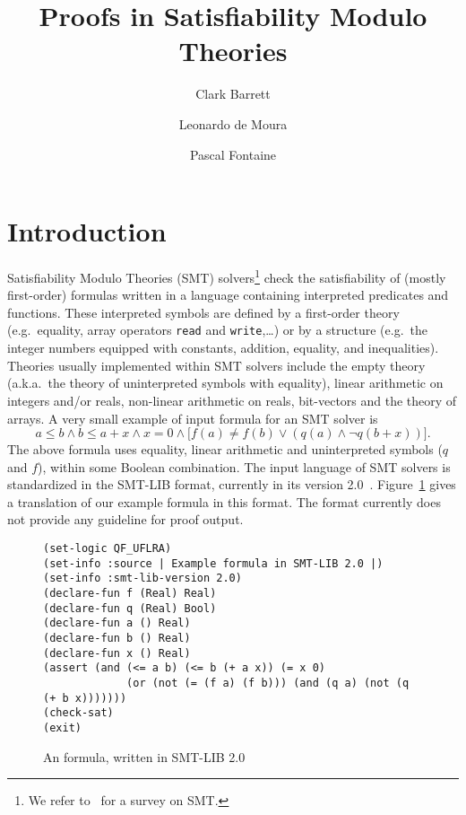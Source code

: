 \documentclass{llncs}
\title{ Proofs in Satisfiability Modulo Theories }
\author{
  Clark Barrett \inst{1}
  \and 
  Leonardo de Moura \inst{2}
  \and
  Pascal Fontaine \inst{3}
}
\institute{
  New York University\\
  \email{barrett@cs.nyu.edu}
  \and 
  Microsoft Research \\
  \email{leonardo@microsoft.com}
  \and
  University of Lorraine and INRIA\\
  \email{pascal.fontaine@inria.fr}
}
\begin{document}
\maketitle

\section{Introduction}

Satisfiability Modulo Theories (SMT) solvers\footnote{We refer
  to~\cite{Barrett14} for a survey on SMT.} check the satisfiability of (mostly
first-order) formulas written in a language containing interpreted predicates
and functions.  These interpreted symbols are defined by a first-order theory
(e.g.\ equality, array operators {\tt read} and {\tt write},\dots) or by a
structure (e.g.\ the integer numbers equipped with constants, addition,
equality, and inequalities).  Theories usually implemented within SMT solvers
include the empty theory (a.k.a.\ the theory of uninterpreted symbols with
equality), linear arithmetic on integers and/or reals, non-linear arithmetic on
reals, bit-vectors and the theory of arrays.  A very small example of input
formula for an SMT solver is
\begin{displaymath}
a \leq b \wedge b \leq a + x \wedge x = 0 \wedge
 \big[ f(a) \neq f(b) \vee (q(a) \wedge \neg q(b + x)) \big].
\end{displaymath}
The above formula uses equality, linear arithmetic and uninterpreted symbols
($q$ and $f$), within some Boolean combination.  The input language of SMT
solvers is standardized in the SMT-LIB format, currently in its version
2.0~\cite{Barrett15}.  Figure~\ref{fig:smtlib} gives a translation of our example formula
in this format.  The format currently does not provide any guideline for proof
output.

\begin{figure}
{\footnotesize
\begin{verbatim}
(set-logic QF_UFLRA)
(set-info :source | Example formula in SMT-LIB 2.0 |)
(set-info :smt-lib-version 2.0)
(declare-fun f (Real) Real)
(declare-fun q (Real) Bool)
(declare-fun a () Real)
(declare-fun b () Real)
(declare-fun x () Real)
(assert (and (<= a b) (<= b (+ a x)) (= x 0)
             (or (not (= (f a) (f b))) (and (q a) (not (q (+ b x)))))))
(check-sat)
(exit)
\end{verbatim}
}
\caption{\label{fig:smtlib} An formula, written in SMT-LIB 2.0}
\end{figure}
\end{document}

